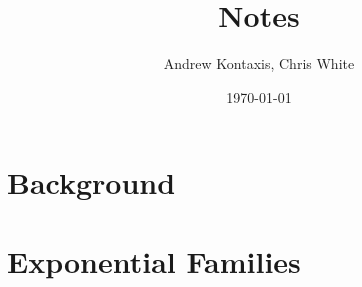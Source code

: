 \documentclass[11pt,a4paper]{article}
\title{Notes}
\author{Andrew Kontaxis, Chris White}
\date{\today}
\begin{document}
\maketitle


\section{Background}



\section{Exponential Families}

\end{document}
